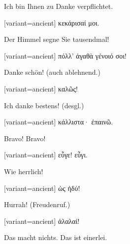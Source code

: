 Ich bin Ihnen zu Danke verpflichtet.

\switchcolumn

\begin{greek}[variant=ancient]%
κεκάρισαί μοι.

\end{greek}%
\switchcolumn*

Der Himmel segne Sie tausendmal!

\switchcolumn

\begin{greek}[variant=ancient]%
πόλλ' ἀγαθὰ γένοιό σοι!

\end{greek}%
\switchcolumn*

Danke schön! (auch ablehnend.)

\switchcolumn

\begin{greek}[variant=ancient]%
καλῶς!

\end{greek}%
\switchcolumn*

Ich danke bestens! (des\textcompwordmark{}gl.)

\switchcolumn

\begin{greek}[variant=ancient]%
κάλλιστα· ἐπαινῶ.

\end{greek}%
\switchcolumn*

Bravo! Bravo!

\switchcolumn

\begin{greek}[variant=ancient]%
εὖγε! εὖγι.

\end{greek}%
\switchcolumn*

Wie herrlich!

\switchcolumn

\begin{greek}[variant=ancient]%
ὡς ἡδύ!

\end{greek}%
\switchcolumn*

Hurrah! (Freudenruf.)

\switchcolumn

\begin{greek}[variant=ancient]%
ἀλαλαί!

\end{greek}%
\switchcolumn*

Das macht nichts. Das ist einerlei.

\switchcolumn

